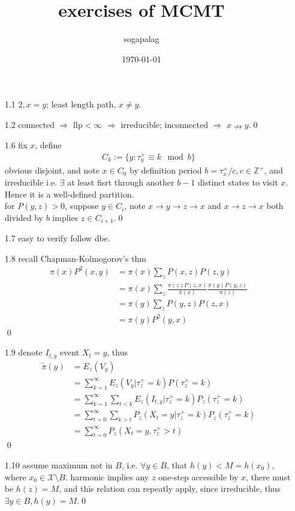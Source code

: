\documentclass[paper=a4, fontsize=11pt]{scrartcl} %
\title{exercises of MCMT}
\author{sogapalag}
\date{\normalsize\today}
\numberwithin{equation}{section} %
\numberwithin{figure}{section} %
\numberwithin{table}{section} %
\begin{document}
\maketitle
\begin{itemize}
	\item[1.1] $2,x=y$; least length path, $x\neq y$.
	\item[1.2] connected $\Rightarrow$ llp$<\infty$ $\Rightarrow$ irreducible; inconnected $\Rightarrow$ $x\nrightarrow y$.\qed
	\item[1.6] fix $x$, define
	\begin{align}
		C_k := \{y:\tau_y^+ \equiv k \mod b\}
	\end{align}
	obvious disjoint, and note $x\in C_0$ by definition period $b=\tau_x^+/c,c\in \mathbb{Z}^+$, and irreducible i.e. $\exists$ at least fisrt through another $b-1$ distinct states to visit $x$. Hence it is a well-defined partition.\\
	for $P(y,z)>0$, suppose $y\in C_i$, note $x\rightarrow y\rightarrow z\rightarrow x$ and $x\rightarrow z \rightarrow x$ both divided by $b$ implies $z\in C_{i+1}$.\qed
	\item[1.7] easy to verify follow dbe.
	\item[1.8] recall Chapman-Kolmogorov's thm
	\begin{align}
		\pi(x)P^2(x,y) &= \pi(x)\sum_z P(x,z)P(z,y)\\
			&= \pi(x) \sum_z \frac{\pi(z)P(z,x)}{\pi(x)} \frac{\pi(y)P(y,z)}{\pi(z)}\\
			&= \pi(y) \sum_zP(y,z)P(z,x)\\
			&= \pi(y) P^2(y,x)
	\end{align}\qed
	\item[1.9] denote $I_{t,y}$ event $X_t=y$, thus
	\begin{align}
		\tilde{\pi}(y) &= E_z(V_y)\\
			&= \sum_{k=1}^\infty E_z(V_y|\tau_z^+=k)P(\tau_z^+=k)\\
			&= \sum_{k=1}^\infty \sum_{t<k} E_z(I_{t,y}|\tau_z^+=k)P_z(\tau_z^+=k)\\
			&= \sum_{t=0}^\infty \sum_{k>t} P_z(X_t=y|\tau_z^+=k)P_z(\tau_z^+=k)\\
			&= \sum_{t=0}^\infty P_z(X_t=y, \tau_z^+>t)
	\end{align}\qed
	\item[1.10] assume maximum not in $B$, i.e. $\forall y\in B$, that $h(y)<M=h(x_0)$, where $x_0\in \mathcal{X}\setminus B$. harmonic implies any $z$  one-step accessible by $x$, there must be $h(z)=M$, and this relation can repeatly apply, since irreducible, thus $\exists y\in B,h(y)=M$.\qed 

\end{itemize}
\end{document}
